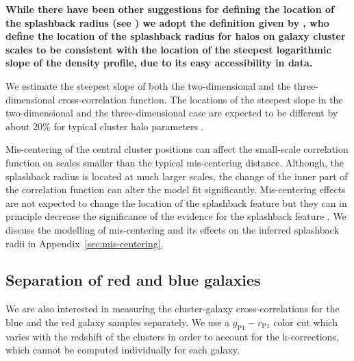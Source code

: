 \documentclass[iop, apjl, twocolappendix, numberedappendix]{emulateapj}
\begin{document}
\textbf{While there have been other suggestions for defining the location of the
splashback radius (see \citet{adhikari2014splashback, shi2016outer, 
mansfield2017splashback, diemer2017splashback}) we adopt the 
definition given by \citet{more2015splashback}, who define
the location of the splashback radius for halos on galaxy cluster scales to 
be consistent with the location of the steepest logarithmic slope of the density
profile, due to its easy accessibility in data.}

We estimate the steepest slope of both the two-dimensional
and the three-dimensional cross-correlation function. The
locations of the steepest slope in the two-dimensional and the
three-dimensional case are expected to be different by
about 20\% for typical cluster halo parameters
\citep{diemer2014dependence, more2016detection}.

Mis-centering of the central cluster positions can affect the
small-scale correlation function on scales smaller than the typical
mis-centering distance.  Although, the splashback radius is located at
much larger scales, the change of the inner part of the correlation
function can alter the model fit significantly.  Mis-centering effects
are not expected to change the location of the splashback feature but
they can in principle decrease the significance of the evidence for
the splashback feature \citep{baxter2017halo}.  We discuss the
modelling of mis-centering and its effects on the inferred splashback
radii in Appendix~\ref{sec:mis-centering}.

\subsection{Separation of red and blue galaxies}
\label{sec:Color}

We are also interested in measuring the cluster-galaxy
cross-correlations for the blue and the red galaxy samples
separately. We use a $g_{\mathrm{P1}}-r_{\mathrm{P1}}$ color cut
which varies with the redshift of the clusters in order to account
for the k-corrections, which cannot be computed individually for
each galaxy.
\end{document}
